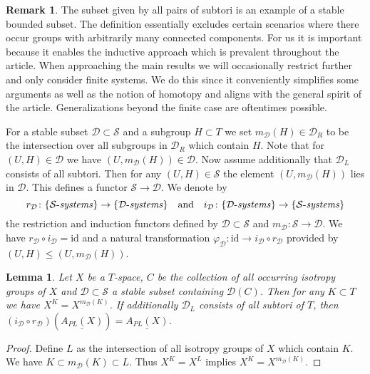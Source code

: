 \documentclass[12pt,a4paper]{article}
\newcommand{\id}{\mathrm{id}}
\newtheorem{lem}[thm]{Lemma}
\theoremstyle{definition}
\newtheorem{rem}[thm]{Remark}
\begin{document}
\begin{rem}\label{rem:disclaimer}
The subset given by all pairs of subtori is an example of a stable bounded subset. The definition essentially excludes certain scenarios where there occur groups with arbitrarily many connected components. For us it is important because it enables the inductive approach which is prevalent throughout the article. When approaching the main results we will occasionally restrict further and only consider finite systems. We do this since it conveniently simplifies some arguments as well as the notion of homotopy and aligns with the general spirit of the article. Generalizations beyond the finite case are oftentimes possible.
\end{rem}

For a stable subset $\mathcal{D}\subset \mathcal{S}$ and a subgroup $H\subset T$ we set $m_\mathcal{D}(H)\in \mathcal{D}_R$ to be the intersection over all subgroups in $\mathcal{D}_R$ which contain $H$. Note that for $(U,H)\in\mathcal{D}$ we have $(U,m_\mathcal{D}(H))\in\mathcal{D}$.
Now assume additionally that $\mathcal{D}_L$ consists of all subtori. Then for any $(U,H)\in\mathcal{S}$ the element $(U,m_\mathcal{D}(H))$ lies in $\mathcal{D}$. This defines a functor $\mathcal{S}\rightarrow\mathcal{D}$.
We denote by
\[r_\mathcal{D}\colon \{\mathcal{S}\text{-\textit{systems}}\}\rightarrow \{\mathcal{D}\text{-\textit{systems}}\}\quad \text{and}\quad i_\mathcal{D}\colon\{\mathcal{D}\text{-\textit{systems}}\}\rightarrow \{\mathcal{S}\text{-\textit{systems}}\}\]
the restriction and induction functors defined by $\mathcal{D}\subset \mathcal{S}$ and $m_\mathcal{D}\colon \mathcal{S}\rightarrow \mathcal{D}$. We have $r_\mathcal{D}\circ i_\mathcal{D}=\id$ and a natural transformation $\varphi_\mathcal{D}\colon \id\rightarrow i_\mathcal{D}\circ r_\mathcal{D}$ provided by $(U,H)\leq (U,m_\mathcal{D}(H))$.




\begin{lem}\label{lem:isotropytypes}
Let $X$ be a $T$-space, $C$ be the collection of all occurring isotropy groups of $X$ and $\mathcal{D}\subset \mathcal{S}$ a stable subset containing $\mathcal{D}(C)$. Then for any $K\subset T$ we have $X^K=X^{m_\mathcal{D}(K)}$. If additionally $\mathcal{D}_L$ consists of all subtori of $T$, then $(i_\mathcal{D}\circ r_\mathcal{D})(\underline{A_{PL}(X)})=\underline{A_{PL}(X)}$.
\end{lem}

\begin{proof}
Define $L$ as the intersection of all isotropy groups of $X$ which contain $K$. We have $K\subset m_\mathcal{D}(K)\subset L$. Thus $X^K=X^L$ implies $X^K=X^{m_\mathcal{D}(K)}$.
\end{proof}
\end{document}
